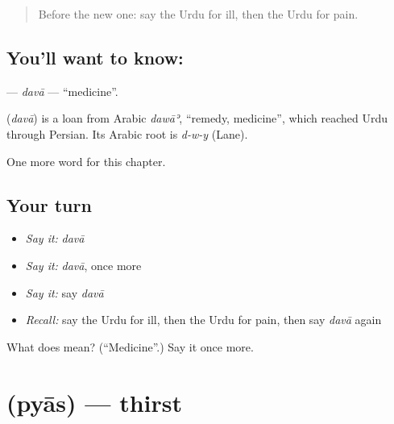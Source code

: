 \label{lesson:UR-C41-dava}



\begin{quote}
Before the new one: say the Urdu for ill, then the Urdu for pain.
\end{quote}

\subsection*{You'll want to know: }
\textbf{} — \emph{davā} — \textquotedblleft{}medicine\textquotedblright{}.

\begin{cousinweb}
\textbf{} (\emph{davā}) is a loan from Arabic \emph{dawāʾ}, \textquotedblleft{}remedy, medicine\textquotedblright{}, which reached Urdu through Persian. Its Arabic root is \emph{d-w-y} (Lane).
\end{cousinweb}

\begin{grammarlens}[title={What you've built}]
One more word for this chapter.
\end{grammarlens}

\subsection*{Your turn}
\begin{itemize}
\raggedright
  \item \emph{Say it:} \emph{davā}
  \item \emph{Say it:} \emph{davā}, once more
  \item \emph{Say it:} say \emph{davā}
  \item \emph{Recall:} say the Urdu for ill, then the Urdu for pain, then say \emph{davā} again
\end{itemize}

\begin{tcolorbox}[breakable,colback=teal!4,colframe=teal!35!black,title={Before you move on}]
What does  mean? (\textquotedblleft{}Medicine\textquotedblright{}.) Say it once more.
\end{tcolorbox}
\section[\texorpdfstring{\ur{پیاس} (pyās)}{پیاس (pyās)}]{ (pyās) — thirst}

\label{lesson:UR-C41-pyas}



